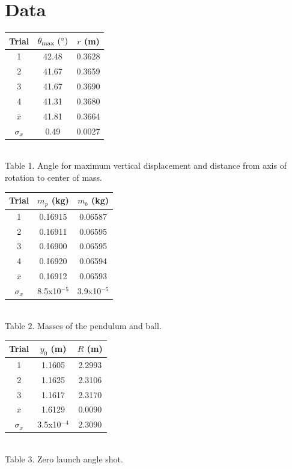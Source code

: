 \documentclass[12pt]{article}
\begin{document}
    \section{Data}
        \begin{center}
            \begin{tabular}{c|cc}
                Trial & \(\theta_{\mathrm{max}} ~( \degree )\) & \(r\) (m)\\
                \hline
                1 & 42.48 & 0.3628\\
                2 & 41.67 & 0.3659\\
                3 & 41.67 & 0.3690\\
                4 & 41.31 & 0.3680\\
                \hline
                \(\overline{x}\) & 41.81 & 0.3664\\
                \(\sigma_x\) & 0.49 & 0.0027
            \end{tabular}\\
            Table 1. Angle for maximum vertical displacement and distance from axis of rotation to center of mass.\\
            \begin{tabular}{c|cc}
                Trial & \(m_p\) (kg) & \(m_b\) (kg)\\
                \hline
                1 & 0.16915 & 0.06587\\
                2 & 0.16911 & 0.06595\\
                3 & 0.16900 & 0.06595\\
                4 & 0.16920 & 0.06594\\
                \hline
                \(\overline{x}\) & 0.16912 & 0.06593\\
                \(\sigma_x\) & 8.5x10\(^{-5}\) & 3.9x10\(^{-5}\)\\
            \end{tabular}\\
            Table 2. Masses of the pendulum and ball.\\
            \begin{tabular}{c|cc}
                Trial & \(y_0\) (m) & \(R\) (m)\\
                \hline
                1 & 1.1605 & 2.2993\\
                2 & 1.1625 & 2.3106\\
                3 & 1.1617 & 2.3170\\
                \hline
                \(\overline{x}\) & 1.6129 & 0.0090\\
                \(\sigma_x\) & 3.5x10\(^{-4}\) & 2.3090
            \end{tabular}\\
            Table 3. Zero launch angle shot.\\
        \end{center}
\end{document}
